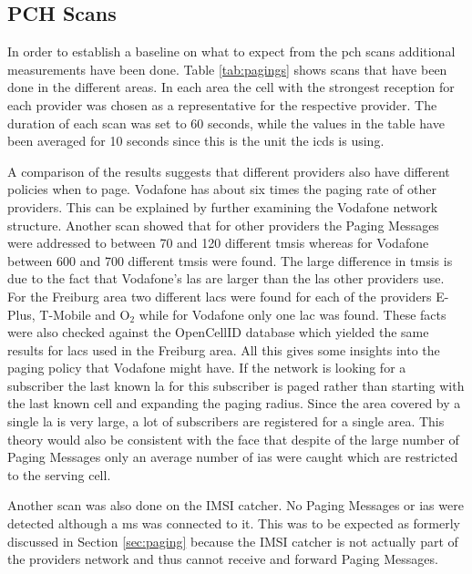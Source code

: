\subsection{PCH Scans}
In order to establish a baseline on what to expect from the \gls{pch} scans additional measurements have been done.
Table \ref{tab:pagings} shows scans that have been done in the different areas.
In each area the cell with the strongest reception for each provider was chosen as a representative for the respective provider.
The duration of each scan was set to 60 seconds, while the values in the table have been averaged for 10 seconds since this is the unit the \gls{icds} is using.

A comparison of the results suggests that different providers also have different policies when to page.
Vodafone has about six times the paging rate of other providers.
This can be explained by further examining the Vodafone network structure.
Another scan showed that for other providers the Paging Messages were addressed to between 70 and 120 different \glspl{tmsi} whereas for Vodafone between 600 and 700 different \glspl{tmsi} were found.
The large difference in \glspl{tmsi} is due to the fact that Vodafone's \glspl{la} are larger than the \glspl{la} other providers use.
For the Freiburg area two different \glspl{lac} were found for each of the providers E-Plus, T-Mobile and O$_2$ while for Vodafone only one \gls{lac} was found.
These facts were also checked against the OpenCellID database which yielded the same results for \glspl{lac} used in the Freiburg area.
All this gives some insights into the paging policy that Vodafone might have.
If the network is looking for a subscriber the last known \gls{la} for this subscriber is paged rather than starting with the last known cell and expanding the paging radius. 
Since the area covered by a single \gls{la} is very large, a lot of subscribers are registered for a single area.
This theory would also be consistent with the face that despite of the large number of Paging Messages only an average number of \glspl{ia} were caught which are restricted to the serving cell.

Another scan was also done on the IMSI catcher.
No Paging Messages or \glspl{ia} were detected although a \gls{ms} was connected to it.
This was to be expected as formerly discussed in Section \ref{sec:paging} because the IMSI catcher is not actually part of the providers network and thus cannot receive and forward Paging Messages.

